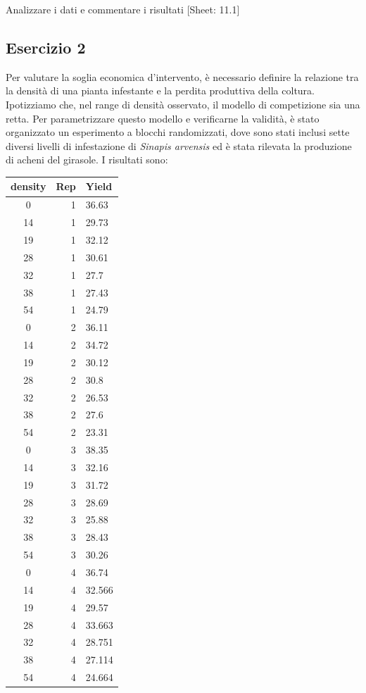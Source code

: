 \documentclass[a4paper,12pt,oneside]{book}
\begin{document}
Analizzare i dati e commentare i risultati
{[}Sheet: 11.1{]}

\hypertarget{esercizio-2-7}{%
\subsection{Esercizio 2}\label{esercizio-2-7}}

Per valutare la soglia economica d'intervento, è necessario definire la relazione tra la densità di una pianta infestante e la perdita produttiva della coltura. Ipotizziamo che, nel range di densità osservato, il modello di competizione sia una retta. Per parametrizzare questo modello e verificarne la validità, è stato organizzato un esperimento a blocchi randomizzati, dove sono stati inclusi sette diversi livelli di infestazione di \emph{Sinapis arvensis} ed è stata rilevata la produzione di acheni del girasole. I risultati sono:

\begin{longtable}[]{@{}crl@{}}
\toprule()
density & Rep & Yield \\
\midrule()
\endhead
0 & 1 & 36.63 \\
14 & 1 & 29.73 \\
19 & 1 & 32.12 \\
28 & 1 & 30.61 \\
32 & 1 & 27.7 \\
38 & 1 & 27.43 \\
54 & 1 & 24.79 \\
0 & 2 & 36.11 \\
14 & 2 & 34.72 \\
19 & 2 & 30.12 \\
28 & 2 & 30.8 \\
32 & 2 & 26.53 \\
38 & 2 & 27.6 \\
54 & 2 & 23.31 \\
0 & 3 & 38.35 \\
14 & 3 & 32.16 \\
19 & 3 & 31.72 \\
28 & 3 & 28.69 \\
32 & 3 & 25.88 \\
38 & 3 & 28.43 \\
54 & 3 & 30.26 \\
0 & 4 & 36.74 \\
14 & 4 & 32.566 \\
19 & 4 & 29.57 \\
28 & 4 & 33.663 \\
32 & 4 & 28.751 \\
38 & 4 & 27.114 \\
54 & 4 & 24.664 \\
\bottomrule()
\end{longtable}
\end{document}
